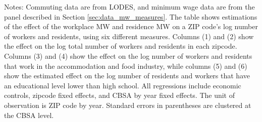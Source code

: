 \begin{table}[hbt!]
    \begin{minipage}{.95\textwidth} \footnotesize
        \vspace{2mm}
        Notes: Commuting data are from LODES, and minimum wage 
        data are from the panel described in Section \ref{sec:data_mw_measures}.
        The table shows estimations of the effect of the workplace MW and
        residence MW on a ZIP code's log number of workers and residents, 
        using six different measures. 
        Columns (1) and (2) show the effect on the log total number of workers 
        and residents in each zipcode.
        Columns (3) and (4) show the effect on the log number of workers and 
        residents that work in the accommodation and food industry, while 
        columns (5) and (6) show the estimated effect on the log number of 
        residents and workers that have an educational level lower than high 
        school. 
        All regressions include economic controls, zipcode fixed effects, 
        and CBSA by year fixed effects.
        The unit of observation is ZIP code by year.
        Standard errors in parentheses are clustered at the CBSA level.
    \end{minipage}
\end{table}
